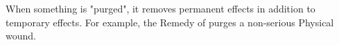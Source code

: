 {  
  
  When something is "purged", it removes permanent effects in addition to temporary effects.  For example, the Remedy of  purges a non-serious Physical wound.  




  \newpage

  
  \newpage
  
  \newpage
  
  \newpage
  
  \newpage
  
  \newpage
  
  \newpage
  
  \newpage
  
  \newpage
  
  \newpage

  
}%

